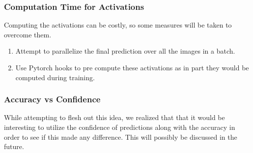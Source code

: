 \subsubsection*{Computation Time for Activations}
Computing the activations can be costly, so some measures will be taken to overcome them.
\begin{enumerate}
    \item Attempt to parallelize the final prediction over all the images in a batch.
    \item Use Pytorch hooks to pre compute these activations as in part they would be computed during training.
\end{enumerate}
\subsubsection*{Accuracy vs Confidence}
While attempting to flesh out this idea, we realized that that it would be interesting to utilize the confidence of predictions along with the accuracy in order to see if this made any difference. This will possibly be discussed in the future.